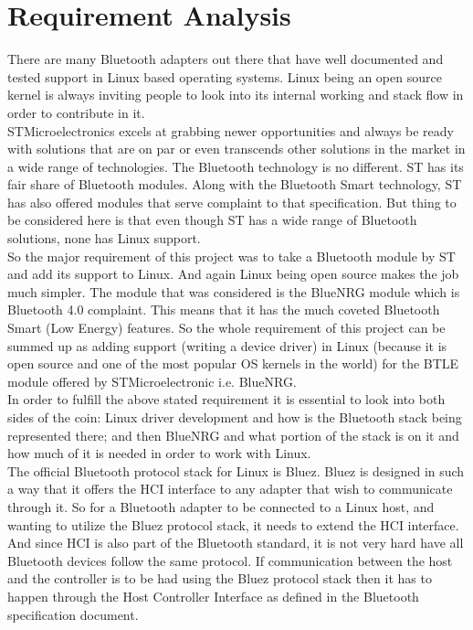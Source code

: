 \section{Requirement Analysis}
There are many Bluetooth adapters out there that have well documented and tested support in Linux based operating systems. Linux being an open source kernel is always inviting people to look into its internal working and stack flow in order to contribute in it.\\
STMicroelectronics excels at grabbing newer opportunities and always be ready with solutions that are on par or even transcends other solutions in the market in a wide range of technologies. The Bluetooth technology is no different. ST has its fair share of Bluetooth modules. Along with the Bluetooth Smart technology, ST has also offered modules that serve complaint to that specification. But thing to be considered here is that even though ST has a wide range of Bluetooth solutions, none has Linux support. \\
So the major requirement of this project was to take a Bluetooth module by ST and add its support to Linux. And again Linux being open source makes the job much simpler. The module that was considered is the BlueNRG module which is Bluetooth 4.0 complaint. This means that it has the much coveted Bluetooth Smart (Low Energy) features. So the whole requirement of this project can be summed up as adding support (writing a device driver) in Linux (because it is open source and one of the most popular OS kernels in the world) for the BTLE module offered by STMicroelectronic i.e. BlueNRG.\\
In order to fulfill the above stated requirement it is essential to look into both sides of the coin: Linux driver development and how is the Bluetooth stack being represented there; and then BlueNRG and what portion of the stack is on it and how much of it is needed in order to work with Linux.\\
The official Bluetooth protocol stack for Linux is Bluez. Bluez is designed in such a way that it offers the HCI interface to any adapter that wish to communicate through it. So for a Bluetooth adapter to be connected to a Linux host, and wanting to utilize the Bluez protocol stack, it needs to extend the HCI interface. And since HCI is also part of the Bluetooth standard, it is not very hard have all Bluetooth devices follow the same protocol. If communication between the host and the controller is to be had using the Bluez protocol stack then it has to happen through the Host Controller Interface as defined in the Bluetooth specification document.\\
